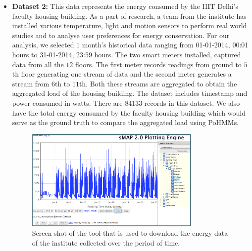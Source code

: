 \documentclass[runningheads,a4paper]{llncs}
\begin{document}
\begin{itemize}
\item \textbf{Dataset 2:} This data represents the energy consumed by the IIIT Delhi's faculty housing building. As a part of research, a team from the institute has installed various temperature, light and motion sensors to perform real world studies and to analyse user preferences for energy conservation. For our analysis, we selected $1$ month's historical data ranging from 01-01-2014, 00:01 hours to 31-01-2014, 23:59 hours. The two smart meters installed, captured data from all the $12$ floors. The first meter records readings from ground to $5$th floor generating one stream of data and the second meter generates a stream from $6$th to $11$th. Both these streams are aggregated to obtain the aggregated load of the housing building. The dataset includes timestamp and power consumed in watts. There are $84133$ records in this dataset. We also have the total energy consumed by the faculty housing building which would serve as the ground truth to compare the aggregated load using PoHMMs.


\begin{figure}[t]
\centering
\includegraphics[width=0.8\textwidth,height=0.35\textheight]{./screenshot}
\caption{Screen shot of the tool that is used to download the energy data of the institute collected over the period of time.}
\label{fig:screenshot}
\end{figure}



\end{itemize}
\end{document}
